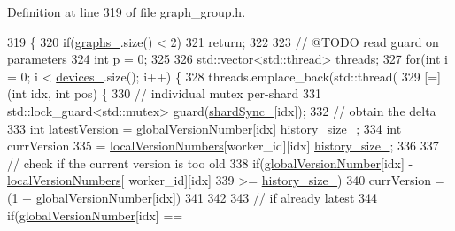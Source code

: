 Definition at line 319 of file graph\+\_\+group.\+h.


\begin{DoxyCode}
319                                                           \{
320     \textcolor{keywordflow}{if}(\hyperlink{classmarian_1_1AsyncGraphGroup_a3fbad41763c988a5723a39c2220287d8}{graphs\_}.size() < 2)
321       \textcolor{keywordflow}{return};
322 
323     \textcolor{comment}{// @TODO read guard on parameters}
324     \textcolor{keywordtype}{int} p = 0;
325 
326     std::vector<std::thread> threads;
327     \textcolor{keywordflow}{for}(\textcolor{keywordtype}{int} i = 0; i < \hyperlink{classmarian_1_1AsyncGraphGroup_a9fcc6fe896fe0c623a1cde656c6e123e}{devices\_}.size(); i++) \{
328       threads.emplace\_back(std::thread(
329           [=](\textcolor{keywordtype}{int} idx, \textcolor{keywordtype}{int} pos) \{
330             \textcolor{comment}{// individual mutex per-shard}
331             std::lock\_guard<std::mutex> guard(\hyperlink{classmarian_1_1AsyncGraphGroup_a5bf268b84c19070341c67f9c8617b1b2}{shardSync\_}[idx]);
332             \textcolor{comment}{// obtain the delta}
333             \textcolor{keywordtype}{int} latestVersion = \hyperlink{classmarian_1_1AsyncGraphGroup_a75884703e6fe8efb3c75293eb912bce4}{globalVersionNumber}[idx] %
      \hyperlink{classmarian_1_1AsyncGraphGroup_a0958c1384fc7486dd4f739d69c9ac636}{history\_size\_};
334             \textcolor{keywordtype}{int} currVersion
335                 = \hyperlink{classmarian_1_1AsyncGraphGroup_a51752a96c753b4c3b34a4c8c3eec86ba}{localVersionNumbers}[worker\_id][idx] %
      \hyperlink{classmarian_1_1AsyncGraphGroup_a0958c1384fc7486dd4f739d69c9ac636}{history\_size\_};
336 
337             \textcolor{comment}{// check if the current version is too old}
338             \textcolor{keywordflow}{if}(\hyperlink{classmarian_1_1AsyncGraphGroup_a75884703e6fe8efb3c75293eb912bce4}{globalVersionNumber}[idx] - \hyperlink{classmarian_1_1AsyncGraphGroup_a51752a96c753b4c3b34a4c8c3eec86ba}{localVersionNumbers}[
      worker\_id][idx]
339                >= \hyperlink{classmarian_1_1AsyncGraphGroup_a0958c1384fc7486dd4f739d69c9ac636}{history\_size\_})
340               currVersion = (1 + \hyperlink{classmarian_1_1AsyncGraphGroup_a75884703e6fe8efb3c75293eb912bce4}{globalVersionNumber}[idx])
341                             %
342 
343             \textcolor{comment}{// if already latest}
344             \textcolor{keywordflow}{if}(\hyperlink{classmarian_1_1AsyncGraphGroup_a75884703e6fe8efb3c75293eb912bce4}{globalVersionNumber}[idx] == 

\end{DoxyCode}
